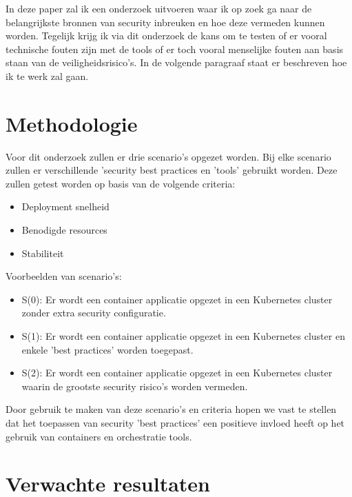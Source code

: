 In deze paper zal ik een onderzoek uitvoeren waar ik op zoek ga naar de belangrijkste bronnen van security inbreuken en hoe deze vermeden kunnen worden.
Tegelijk krijg ik via dit onderzoek de kans om te testen of er vooral technische fouten zijn met de tools of er toch vooral menselijke fouten aan basis staan van de veiligheidsrisico's.
In de volgende paragraaf staat er beschreven hoe ik te werk zal gaan.

\section{Methodologie}
\label{sec:methodologie}

Voor dit onderzoek zullen er drie scenario's opgezet worden. Bij elke scenario zullen er verschillende 'security best practices en 'tools' gebruikt worden.
Deze zullen getest worden op basis van de volgende criteria: \newline
\begin{itemize}
	\item Deployment snelheid
	\item Benodigde resources
	\item Stabiliteit \newline
\end{itemize} 
Voorbeelden van scenario's: \newline
\begin{itemize}
	\item S(0): Er wordt een container applicatie opgezet in een Kubernetes cluster zonder extra security configuratie.
	\item S(1): Er wordt een container applicatie opgezet in een Kubernetes cluster en enkele 'best practices' worden toegepast.
	\item S(2): Er wordt een container applicatie opgezet in een Kubernetes cluster waarin de grootste security risico's worden vermeden. \newline
\end{itemize} 
Door gebruik te maken van deze scenario's en criteria hopen we vast te stellen dat het toepassen van security 'best practices' een positieve invloed heeft op het gebruik van containers en orchestratie tools.

\section{Verwachte resultaten}
\label{sec:verwachte_resultaten}

